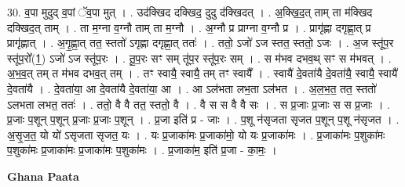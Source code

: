\documentclass[17pt]{extarticle}
\begin{document}
30. व॒पा मुदुद् व॒पां ॅव॒पा मुत् । . उद॑क्खिद दक्खिद॒ दुदु द॑क्खिदत् । . अ॒क्खि॒द॒त् ताम् ता म॑क्खिद दक्खिद॒त् ताम् । . ता म॒ग्ना व॒ग्नौ ताम् ता म॒ग्नौ । . अ॒ग्नौ प्र प्राग्ना व॒ग्नौ प्र । . प्रागृ॑ह्णा दगृह्णा॒त् प्र प्रागृ॑ह्णात् । . अ॒गृ॒ह्णा॒त् तत॒ स्ततो॑ ऽगृह्णा दगृह्णा॒त् ततः॑ । . ततो॒ ऽजो॑ ऽज स्तत॒ स्ततो॒ ऽजः । . अ॒ज स्तू॑प॒र स्तू॑प॒रो᳚(1॒) ऽजो॑ ऽज स्तू॑प॒रः । . तू॒प॒रः सꣳ सम् तू॑प॒र स्तू॑प॒रः सम् । . स म॑भव दभव॒थ् सꣳ स म॑भवत् । . अ॒भ॒व॒त् तम् त म॑भव दभव॒त् तम् । . तꣳ स्वायै॒ स्वायै॒ तम् तꣳ स्वायै᳚ । . स्वायै॑ दे॒वता॑यै दे॒वता॑यै॒ स्वायै॒ स्वायै॑ दे॒वता॑यै । . दे॒वता॑या॒ आ दे॒वता॑यै दे॒वता॑या॒ आ । . आ ऽल॑भता लभ॒ता ऽल॑भत । . अ॒ल॒भ॒त॒ तत॒ स्ततो॑ ऽलभता लभत॒ ततः॑ । . ततो॒ वै वै तत॒ स्ततो॒ वै । . वै स स वै वै सः । . स प्र॒जाः प्र॒जाः स स प्र॒जाः । . प्र॒जाः प॒शून् प॒शून् प्र॒जाः प्र॒जाः प॒शून् । . प्र॒जा इति॑ प्र - जाः । . प॒शू न॑सृजता सृजत प॒शून् प॒शू न॑सृजत । . अ॒सृ॒ज॒त॒ यो यो॑ ऽसृजता सृजत॒ यः । . यः प्र॒जाका॑मः प्र॒जाका॑मो॒ यो यः प्र॒जाका॑मः । . प्र॒जाका॑मः प॒शुका॑मः प॒शुका॑मः प्र॒जाका॑मः प्र॒जाका॑मः प॒शुका॑मः । . प्र॒जाका॑म॒ इति॑ प्र॒जा - का॒मः॒ । \newline

\textbf{Ghana Paata } \newline
\end{document}
